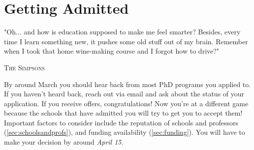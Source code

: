 \documentclass[oneside,11pt]{memoir}
\begin{document}








%


\chapter{Getting Admitted}\label{sec:accepted}

\epigraph{"Oh... and how is education supposed to make me feel smarter? Besides, every time I learn something new, it pushes some old stuff out of my brain. Remember when I took that home wine-making course and I forgot how to drive?"}{\textsc{The Simpsons}}

By around March you should hear back from most PhD programs you applied to. If you haven't heard back, reach out via email and ask about the status of your application.
If you receive offers, congratulations!  Now you're at a different game because the schools that have admitted you will try to get you to accept them!  Important factors to consider include the reputation of schools and professors (\autoref{sec:schoolsandprofs}), and funding availability (\autoref{sec:funding}). You will have to make your decision by around \emph{April 15}.
\end{document}
